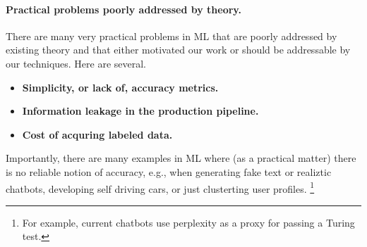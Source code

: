 \paragraph{Practical problems poorly addressed by theory.}
There are many very practical problems in ML that are poorly addressed by existing theory and that either motivated our work or should be addressable by our techniques.
Here are several.
\begin{itemize}
\item
\textbf{Simplicity, or lack of,  accuracy metrics.}
\item
\textbf{Information leakage in the production pipeline.}
\item
\textbf{Cost of acquring labeled data.}
\end{itemize}
Importantly, there are many examples in ML where (as a practical matter) there is no reliable notion of accuracy, e.g., when generating fake text or realiztic chatbots, developing self driving cars, or just clusterting user profiles.
\footnote{For example, current chatbots use perplexity as a proxy for passing a Turing test.}
